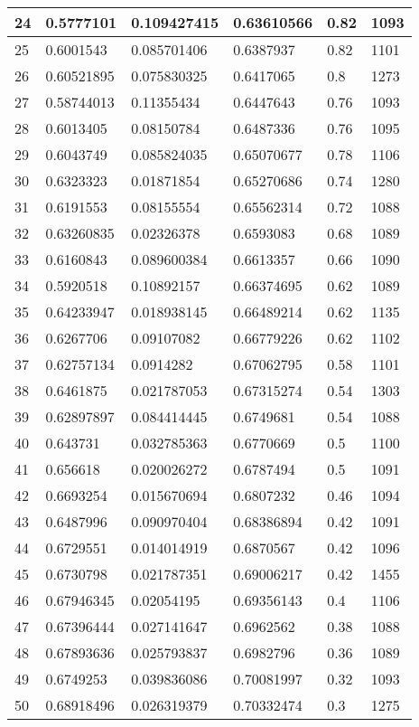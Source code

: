 \begin{longtable}{|l|l|l|l|l|l|}
24 & 0.5777101 & 0.109427415 & 0.63610566 & 0.82 & 1093 \\ \hline 
25 & 0.6001543 & 0.085701406 & 0.6387937 & 0.82 & 1101 \\ \hline 
26 & 0.60521895 & 0.075830325 & 0.6417065 & 0.8 & 1273 \\ \hline 
27 & 0.58744013 & 0.11355434 & 0.6447643 & 0.76 & 1093 \\ \hline 
28 & 0.6013405 & 0.08150784 & 0.6487336 & 0.76 & 1095 \\ \hline 
29 & 0.6043749 & 0.085824035 & 0.65070677 & 0.78 & 1106 \\ \hline 
30 & 0.6323323 & 0.01871854 & 0.65270686 & 0.74 & 1280 \\ \hline 
31 & 0.6191553 & 0.08155554 & 0.65562314 & 0.72 & 1088 \\ \hline 
32 & 0.63260835 & 0.02326378 & 0.6593083 & 0.68 & 1089 \\ \hline 
33 & 0.6160843 & 0.089600384 & 0.6613357 & 0.66 & 1090 \\ \hline 
34 & 0.5920518 & 0.10892157 & 0.66374695 & 0.62 & 1089 \\ \hline 
35 & 0.64233947 & 0.018938145 & 0.66489214 & 0.62 & 1135 \\ \hline 
36 & 0.6267706 & 0.09107082 & 0.66779226 & 0.62 & 1102 \\ \hline 
37 & 0.62757134 & 0.0914282 & 0.67062795 & 0.58 & 1101 \\ \hline 
38 & 0.6461875 & 0.021787053 & 0.67315274 & 0.54 & 1303 \\ \hline 
39 & 0.62897897 & 0.084414445 & 0.6749681 & 0.54 & 1088 \\ \hline 
40 & 0.643731 & 0.032785363 & 0.6770669 & 0.5 & 1100 \\ \hline 
41 & 0.656618 & 0.020026272 & 0.6787494 & 0.5 & 1091 \\ \hline 
42 & 0.6693254 & 0.015670694 & 0.6807232 & 0.46 & 1094 \\ \hline 
43 & 0.6487996 & 0.090970404 & 0.68386894 & 0.42 & 1091 \\ \hline 
44 & 0.6729551 & 0.014014919 & 0.6870567 & 0.42 & 1096 \\ \hline 
45 & 0.6730798 & 0.021787351 & 0.69006217 & 0.42 & 1455 \\ \hline 
46 & 0.67946345 & 0.02054195 & 0.69356143 & 0.4 & 1106 \\ \hline 
47 & 0.67396444 & 0.027141647 & 0.6962562 & 0.38 & 1088 \\ \hline 
48 & 0.67893636 & 0.025793837 & 0.6982796 & 0.36 & 1089 \\ \hline 
49 & 0.6749253 & 0.039836086 & 0.70081997 & 0.32 & 1093 \\ \hline 
50 & 0.68918496 & 0.026319379 & 0.70332474 & 0.3 & 1275 \\ \hline 
\end{longtable}